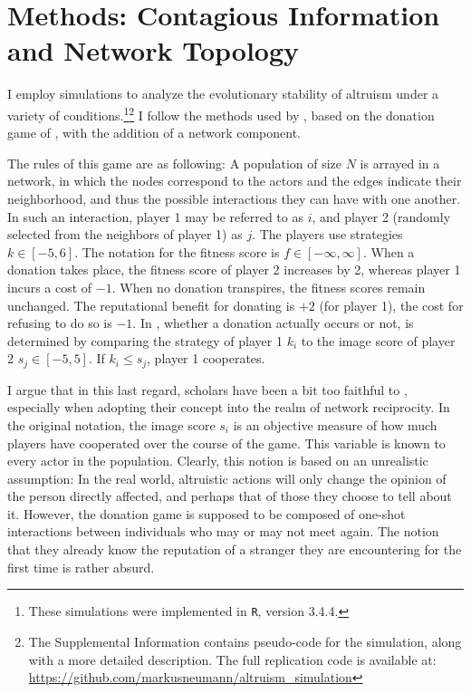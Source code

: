 \documentclass[12pt]{article}
\begin{document}
\section*{Methods: Contagious Information and Network Topology}
I employ simulations to analyze the evolutionary stability of altruism under a variety of conditions.\footnote{These simulations were implemented in \texttt{R}, version 3.4.4.}\footnote{The Supplemental Information contains pseudo-code for the simulation, along with a more detailed description. The full replication code is available at: \url{https://github.com/markusneumann/altruism_simulation}} I follow the methods used by \cite{Peleteiro2014}, based on the donation game of \cite{Nowak1998}, with the addition of a network component.

The rules of this game are as following: A population of size $N$ is arrayed in a network, in which the nodes correspond to the actors and the edges indicate their neighborhood, and thus the possible interactions they can have with one another. In such an interaction, player 1 may be referred to as $i$, and player 2 (randomly selected from the neighbors of player 1) as $j$. The players use strategies $k \in [-5,6]$. The notation for the fitness score is $f \in [-\infty,\infty]$. When a donation takes place, the fitness score of player 2 increases by 2, whereas player 1 incurs a cost of $-1$. When no donation transpires, the fitness scores remain unchanged. The reputational benefit for donating is $+2$ (for player 1), the cost for refusing to do so is $-1$. In \cite{Peleteiro2014}, whether a donation actually occurs or not, is determined by comparing the strategy of player 1 $k_i$ to the image score of player 2 $s_j \in [-5,5]$. If $k_i\leq s_j$, player 1 cooperates.

I argue that in this last regard, scholars have been a bit too faithful to \cite{Nowak1998}, especially when adopting their concept into the realm of network reciprocity. In the original notation, the image score $s_i$ is an objective measure of how much players have cooperated over the course of the game. This variable is known to every actor in the population. Clearly, this notion is based on an unrealistic assumption: In the real world, altruistic actions will only change the opinion of the person directly affected, and perhaps that of those they choose to tell about it. However, the donation game is supposed to be composed of one-shot interactions between individuals who may or may not meet again. The notion that they already know the reputation of a stranger they are encountering for the first time is rather absurd.
\end{document}
